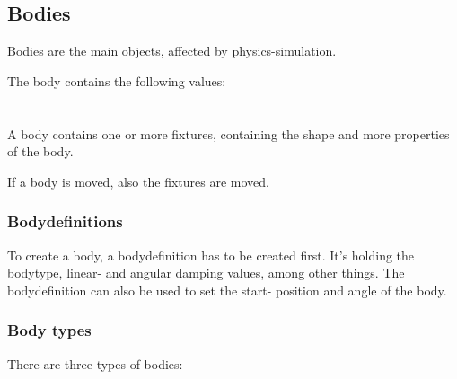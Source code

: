 \documentclass[10pt,a4paper,DIV=11]{scrreprt}
\begin{document}
\subsection{Bodies}
Bodies are the main objects, affected by physics-simulation.

The body contains the following values: \\

   \\
\\

A body contains one or more fixtures, containing the shape and more properties of the body.

If a body is moved, also the fixtures are moved.

\subsubsection*{Bodydefinitions}
To create a body, a bodydefinition has to be created first. It's holding the bodytype, linear- and angular damping values, among other things.
The bodydefinition can also be used to set the start- position and angle of the body.

\subsubsection*{Body types}
There are three types of bodies:

   \\
\\
\end{document}
